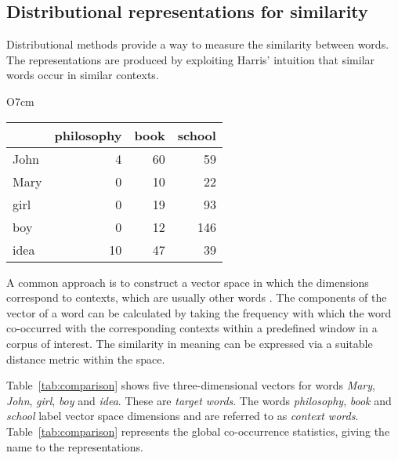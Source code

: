 \subsection{Distributional representations for similarity}
\label{sec:distributional-representations}

Distributional methods provide a way to measure the similarity between words. The representations are produced by exploiting Harris' \citeyearpar{harris1954distributional} intuition that similar words occur in similar contexts.

\label{sec:distr-repr}

\begin{wraptable}[10]{O}{7cm}
  \centering
  \begin{tabular}{lrrr}
    \toprule
    & philosophy & book & school \\
    \midrule
    John & 4  & 60 & 59  \\
    Mary & 0  & 10 & 22  \\
    girl & 0  & 19 & 93  \\
    boy  & 0  & 12 & 146 \\
    idea & 10 & 47 & 39  \\
    \bottomrule
  \end{tabular}
  \caption{Word co-occurrence frequencies extracted from the BNC}
  \label{tab:comparison}
\end{wraptable}

A common approach is to construct a vector space in which the dimensions correspond to contexts, which are usually other words \cite{Turney:2010:FMV:1861751.1861756}. The components of the vector of a word can be calculated by taking the frequency with which the word co-occurred with the corresponding contexts within a predefined window in a corpus of interest. The similarity in meaning can be expressed via a suitable distance metric within the space.

Table~\ref{tab:comparison} shows five three-dimensional vectors for words \textit{Mary}, \textit{John}, \textit{girl}, \textit{boy} and \textit{idea}. These are \textit{target words}.  The words \textit{philosophy}, \textit{book} and \textit{school} label vector space dimensions and are referred to as \emph{context words}. Table~\ref{tab:comparison} represents the global co-occurrence statistics, giving the name to the representations.

